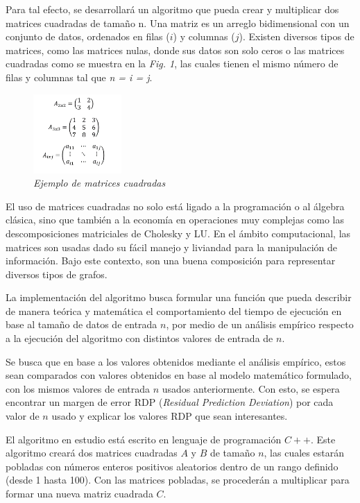 \documentclass[11pt, twocolumn]{llncs}
\begin{document}
Para tal efecto, se desarrollará un algoritmo que pueda crear y multiplicar dos matrices cuadradas de tamaño n. Una matriz es un arreglo bidimensional con un conjunto de datos, ordenados en filas ($i$) y columnas ($j$). Existen diversos tipos de matrices, como las matrices nulas, donde sus datos son solo ceros o las matrices cuadradas como se muestra en la \textit{Fig. 1}, las cuales tienen el mismo número de filas y columnas tal que \textit{n = i = j}.

\begin{figure}
\caption{\textit{\label{fig:matrices}Ejemplo de matrices cuadradas}}
\centering
\includegraphics[width=0.3\textwidth]{imagenes/matrices.png}
\end{figure}

El uso de matrices cuadradas no solo está ligado a la programación o al álgebra clásica, sino que también a la economía en operaciones muy complejas como las descomposiciones matriciales de Cholesky y LU. En el ámbito computacional, las matrices son usadas dado su fácil manejo y liviandad para la manipulación de información. Bajo este contexto, son una buena composición para representar diversos tipos de grafos.

La implementación del algoritmo busca formular una función que pueda describir de manera teórica y matemática el comportamiento del tiempo de ejecución en base al tamaño de datos de entrada $n$, por medio de un análisis empírico respecto a la ejecución del algoritmo con distintos valores de entrada de $n$.

Se busca que en base a los valores obtenidos mediante el análisis empírico, estos sean comparados con valores obtenidos en base al modelo matemático formulado, con los mismos valores de entrada $n$ usados anteriormente. Con esto, se espera encontrar un margen de error RDP (\textit{Residual Prediction Deviation}) por cada valor de $n$ usado y explicar los valores RDP que sean interesantes.

El algoritmo en estudio está escrito en lenguaje de programación $C++$. Este algoritmo creará dos matrices cuadradas $A$ y $B$ de tamaño $n$, las cuales estarán pobladas con números enteros positivos aleatorios dentro de un rango definido (desde 1 hasta 100). Con las matrices pobladas, se procederán a multiplicar para formar una nueva matriz cuadrada $C$.
\end{document}
